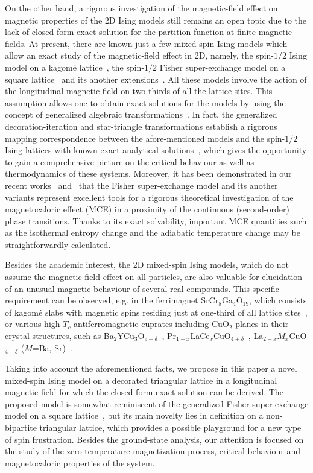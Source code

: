 \documentclass[final,5p,times,sort&compress]{elsarticle}
\begin{document}
On the other hand, a rigorous investigation of the magnetic-field effect on magnetic properties of the 2D Ising models still remains an open topic due to the lack of closed-form exact solution for the partition function at finite magnetic fields. At present, there are known just a few mixed-spin Ising models which allow an exact study of the magnetic-field effect in 2D, namely, the spin-$1/2$ Ising model on a kagom\'e lattice~\cite{Gia88,Aza88,Lu05}, the spin-$1/2$ Fisher super-exchange model on a square lattice~\cite{Fis60a, Fis60b} and its another extensions~\cite{Hat68, Mas73, Can06, Gal16}. All these models involve the action of the longitudinal magnetic field on two-thirds of all the lattice sites. This assumption allows one to obtain exact solutions for the models by using the concept of generalized algebraic transformations~\cite{Fis59,Dom60,Syo72,Str10}. In fact, the generalized decoration-iteration and star-triangle transformations establish a rigorous mapping correspondence between the afore-mentioned models and the spin-$1/2$ Ising lattices with known exact analytical solutions~\cite{Dom60,Ons44, Hou50}, which gives the opportunity to gain a comprehensive picture on the critical behaviour as well as thermodynamics of these systems. Moreover, it has been demonstrated in our recent works~\cite{Gal16} and~\cite{Gal17} that the Fisher super-exchange model and its another variants represent excellent tools for a rigorous theoretical investigation of the magnetocaloric effect (MCE) in a proximity of the continuous (second-order) phase transitions. Thanks to its exact solvability, important MCE quantities such as the isothermal entropy change and the adiabatic temperature change may be straightforwardly calculated.

Besides the academic interest, the 2D mixed-spin Ising models, which do not assume the magnetic-field effect on all particles, are also valuable for elucidation of an unusual magnetic behaviour of several real compounds. This specific requirement can be observed, e.g. in the ferrimagnet SrCr$_8$Ga$_4$O$_{19}$, which consists of kagom\'e slabs with magnetic spins residing just at one-third of all lattice sites~\cite{Obr88}, or various high-$T_c$ antiferromagnetic cuprates including CuO$_2$ planes in their crystal structures, such as  Ba$_2$YCu$_3$O$_{9-\delta}$~\cite{Sie87}, Pr$_{1-x}$LaCe$_x$CuO$_{4+\delta}$~\cite{Cam15}, La$_{2-x}M_x$CuO$_{4-\delta}$ ($M$=Ba, Sr)~\cite{Vas89}.

Taking into account the aforementioned facts, we propose in this paper a novel mixed-spin Ising model on a decorated triangular lattice in a longitudinal magnetic field for which the closed-form exact solution can be derived. The proposed model is somewhat reminiscent of the generalized Fisher super-ex\-change model on a square lattice~\cite{Fis60a, Fis60b, Hat68, Mas73, Can06, Gal16}, but its main novelty lies in definition on a non-bipartite triangular lattice, which provides a possible playground for a new type of spin frustration.
Besides the ground-state analysis, our attention is focused on the study of the zero-temperature magnetization process, critical behaviour and magnetocaloric properties of the system.
\end{document}
